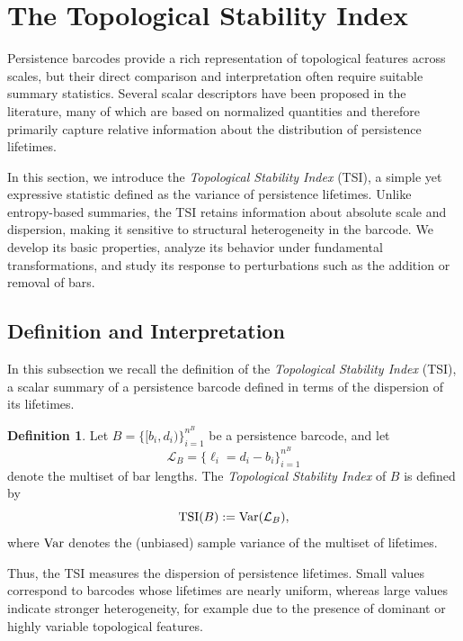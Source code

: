 \documentclass[11pt]{amsart}
\theoremstyle{definition}
\newtheorem{definition}{Definition}[section]
\newcommand{\tsi}[0]{\textup{TSI}}
\newcommand{\var}[0]{\textup{Var}}
\begin{document}
\section{The Topological Stability Index}\label{Sec:The Topological Stability Index}


Persistence barcodes provide a rich representation of topological features across scales, but their direct comparison and interpretation often require suitable summary statistics. Several scalar descriptors have been proposed in the literature, many of which are based on normalized quantities and therefore primarily capture relative information about the distribution of persistence lifetimes.

In this section, we introduce the \emph{Topological Stability Index} (TSI), a simple yet expressive statistic defined as the variance of persistence lifetimes. Unlike entropy-based summaries, the TSI retains information about absolute scale and dispersion, making it sensitive to structural heterogeneity in the barcode. We develop its basic properties, analyze its behavior under fundamental transformations, and study its response to perturbations such as the addition or removal of bars.


\subsection{Definition and Interpretation}

In this subsection we recall the definition of the \emph{Topological Stability Index} (TSI), a scalar summary of a persistence barcode defined in terms of the dispersion of its lifetimes.

\begin{definition}
Let $B=\{[b_i,d_i)\}_{i=1}^{n^B}$ be a persistence barcode, and let
\[
\mathcal{L}_B=\{\ell_i=d_i-b_i\}_{i=1}^{n^B}
\]
denote the multiset of bar lengths. The \emph{Topological Stability Index} of $B$ is defined by
\begin{equation}
    \tsi(B):=\var(\mathcal{L}_B),
\end{equation}
where $\var$ denotes the (unbiased) sample variance of the multiset of lifetimes.
\end{definition}

Thus, the TSI measures the dispersion of persistence lifetimes. Small values correspond to barcodes whose lifetimes are nearly uniform, whereas large values indicate stronger heterogeneity, for example due to the presence of dominant or highly variable topological features.
\end{document}
